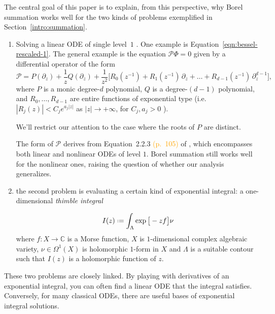\documentclass{article}
\theoremstyle{definition}
\newcommand*{\defeq}{\mathrel{\vcenter{\baselineskip0.5ex \lineskiplimit0pt
                     \hbox{\scriptsize.}\hbox{\scriptsize.}}}%
                     =}
\begin{document}
The central goal of this paper is to explain, from this perspective, why Borel summation works well for the two kinds of problems exemplified in Section~\ref{intro:summation}.
\begin{enumerate}
\item Solving a linear ODE of single level~$1$ \cite[Section 2.1]{EcalleIII}\textcolor{DarkTurquoise}{\cite[Section~5.2.2.1]{diverg-resurg-iii}}. One example is Equation~\eqref{eqn:bessel-rescaled-1}. The general example is the equation $\mathcal{P} \Phi = 0$ given by a differential operator of the form
\[ \mathcal{P} = P(\partial_z) + \frac{1}{z} Q(\partial_z) + \frac{1}{z^2}\big[ R_0(z^{-1}) + R_1(z^{-1})\,\partial_z + \ldots + R_{d-1}(z^{-1})\,\partial_z^{d-1} \big], \]
where $P$ is a monic degree-$d$ polynomial, $Q$ is a degree-$(d-1)$ polynomial, and $R_0, \ldots, R_{d-1}$ are entire functions of exponential type (i.e. $|R_j(z)|<C_j e^{a_j|z|}$ as $|z|\to+\infty$, for $C_j,a_j>0$ ).

We'll restrict our attention to the case where the roots of $P$ are distinct.

The form of $\mathcal{P}$ derives from Equation~2.2.3 \textcolor{orange}{(p.~105)} of \cite{EcalleIII}, which encompasses both linear and nonlinear ODEs of level $1$. Borel summation still works well for the nonlinear ones, raising the question of whether our analysis generalizes.

\item the second problem is evaluating a certain kind of exponential integral: a one-dimensional {\em thimble integral}

\begin{equation}
I(z)\defeq\int_{\Lambda}\exp\big[-z f\big] \nu
\end{equation}
where $f\colon X\to \mathbb{C}$ is a Morse function, $X$ is $1$-dimensional complex algebraic variety, $\nu\in\Omega^1(X)$ is holomorphic $1$-form in $X$ and $\Lambda$ is a suitable contour such that $I(z)$ is a holomorphic function of $z$.  
\end{enumerate}

These two problems are closely linked. By playing with derivatives of an exponential integral, you can often find a linear ODE that the integral satisfies. Conversely, for many classical ODEs, there are useful bases of exponential integral solutions.

\end{document}
